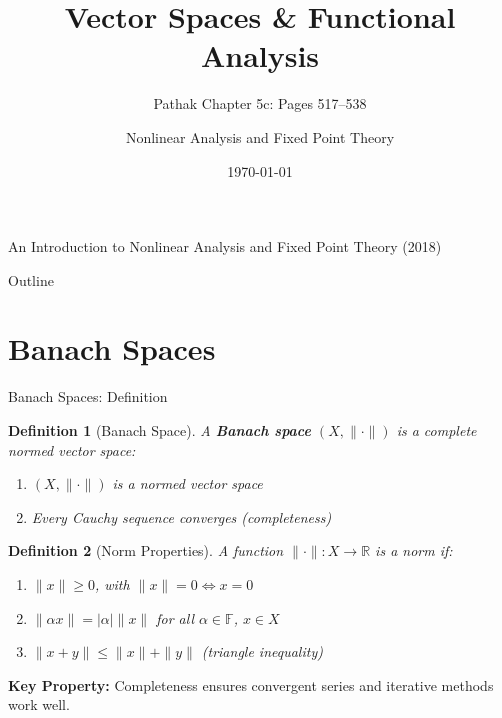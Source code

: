 \documentclass[aspectratio=169,10pt]{beamer}
\title{Vector Spaces \& Functional Analysis}
\subtitle{Pathak Chapter 5c: Pages 517--538}
\author{Nonlinear Analysis and Fixed Point Theory}
\date{\today}
\newtheorem{defn}{Definition}
\begin{document}

\begin{frame}
  \titlepage
  \begin{center}
    \small An Introduction to Nonlinear Analysis and Fixed Point Theory (2018)
  \end{center}
\end{frame}


\begin{frame}[allowframebreaks]{Outline}
  \tableofcontents
\end{frame}


\section{Banach Spaces}

\begin{frame}{Banach Spaces: Definition}
  \begin{defn}[Banach Space]
    A \textbf{Banach space} $(X, \|\cdot\|)$ is a complete normed vector space:
    \begin{enumerate}
      \item $(X, \|\cdot\|)$ is a normed vector space
      \item Every Cauchy sequence converges (completeness)
    \end{enumerate}
  \end{defn}

  \vspace{0.3cm}
  \begin{defn}[Norm Properties]
    A function $\|\cdot\|: X \to \mathbb{R}$ is a norm if:
    \begin{enumerate}
      \item $\|x\| \geq 0$, with $\|x\| = 0 \iff x = 0$
      \item $\|\alpha x\| = |\alpha| \|x\|$ for all $\alpha \in \mathbb{F}$, $x \in X$
      \item $\|x + y\| \leq \|x\| + \|y\|$ (triangle inequality)
    \end{enumerate}
  \end{defn}

  \vspace{0.3cm}
  \textbf{Key Property:} Completeness ensures convergent series and iterative methods work well.
\end{frame}
\end{document}
